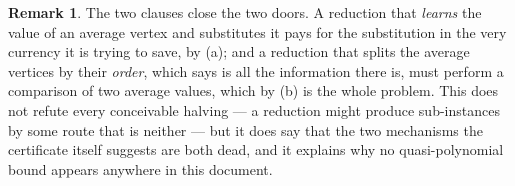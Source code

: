 \documentclass[11pt]{article}
\theoremstyle{plain}
\theoremstyle{definition}
\newtheorem{remark}[theorem]{Remark}
\begin{document}
\begin{remark}\label{rem:no-halving}
The two clauses close the two doors. A reduction that \emph{learns} the
value of an average vertex and substitutes it pays for the substitution
in the very currency it is trying to save, by (a); and a reduction that
splits the average vertices by their \emph{order}, which
 says is all the information there is, must
perform a comparison of two average values, which by (b) is the whole
problem. This does not refute every conceivable halving --- a reduction
might produce sub-instances by some route that is neither --- but it does
say that the two mechanisms the certificate itself suggests are both
dead, and it explains why no quasi-polynomial bound appears anywhere in
this document.
\end{remark}
\end{document}
